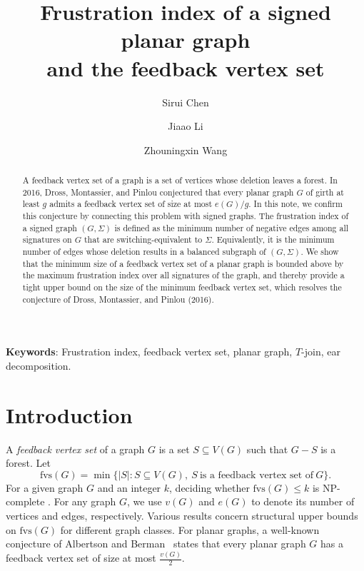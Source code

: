 \documentclass[a4paper,12pt]{article}
\theoremstyle{plain}
\theoremstyle{definition}
\theoremstyle{remark}
\numberwithin{equation}{section}
\begin{document}
\title{Frustration index of a signed planar graph \\ and the feedback vertex set}

\author{Sirui Chen} 

\author{Jiaao Li}

\author{Zhouningxin Wang}



\date{}


\maketitle

\begin{abstract}
A feedback vertex set of a graph is a set of vertices whose deletion leaves a forest. In 2016, Dross, Montassier, and Pinlou conjectured that every planar graph $G$ of girth at least $g$ admits a feedback vertex set of size at most $e(G)/g$. In this note, we confirm this conjecture by connecting this problem with signed graphs. The frustration index of a signed graph $(G,\Sigma)$ is defined as the minimum number of negative edges among all signatures on $G$ that are switching-equivalent to $\Sigma$. Equivalently, it is the minimum number of edges whose deletion results in a balanced subgraph of $(G,\Sigma)$. We show that the minimum size of a feedback vertex set of a planar graph is bounded above by the maximum frustration index over all signatures of the graph, and thereby provide a tight upper bound on the size of the minimum feedback vertex set, which resolves the conjecture of Dross, Montassier, and Pinlou (2016).
\end{abstract}

\noindent
{\bf Keywords}: Frustration index, feedback vertex set, planar graph, $T$-join, ear decomposition.

\section{Introduction}

A \emph{feedback vertex set} of a graph $G$ is a set $S\subseteq V(G)$ such that $G-S$ is a forest. Let $$\mathrm{fvs}(G) = \min \{|S|:S\subseteq V(G),~S~\text{is a feedback vertex set of}~G\}.$$
For a given graph $G$ and an integer $k$, deciding whether $\mathrm{fvs}(G)\le k$ is NP-complete \cite{LY1980}. For any graph $G$, we use $v(G)$ and $e(G)$ to denote its number of vertices and edges, respectively. Various results concern structural upper bounds on $\mathrm{fvs}(G)$ for different graph classes. For planar graphs, a well-known conjecture of Albertson and Berman~\cite{AB1979} states that every planar graph $G$ has a feedback vertex set of size at most $\frac{v(G)}{2}$.
\end{document}
